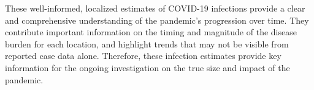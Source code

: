 These well-informed, localized estimates of COVID-19 infections 
provide a clear and comprehensive understanding of the pandemic's progression
over time. They contribute important information on the timing and
magnitude of the disease burden for each location, and highlight trends
that may not be visible from reported case data alone. Therefore, these infection
estimates provide key information for the ongoing investigation on the true size
and impact of the pandemic.

%
%
%
